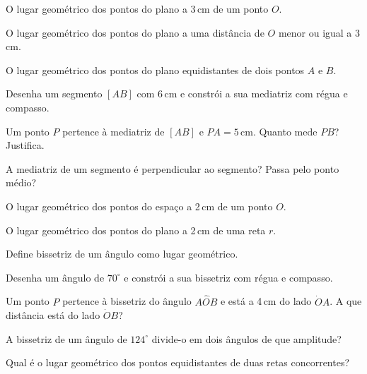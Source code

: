 \documentclass[12pt]{article}
\begin{document}


\begin{exercicios}
  \item O lugar geométrico dos pontos do plano a 3\,cm de um ponto $O$.
  \item O lugar geométrico dos pontos do plano a uma distância de $O$ menor ou igual a 3\,cm.
  \item O lugar geométrico dos pontos do plano equidistantes de dois pontos $A$ e $B$.
  \item Desenha um segmento $[AB]$ com 6\,cm e constrói a sua mediatriz com régua e compasso.
  \item Um ponto $P$ pertence à mediatriz de $[AB]$ e $PA = 5$\,cm. Quanto mede $PB$? Justifica.
  \item A mediatriz de um segmento é perpendicular ao segmento? Passa pelo ponto médio?
  \item O lugar geométrico dos pontos do espaço a 2\,cm de um ponto $O$.
  \item O lugar geométrico dos pontos do plano a 2\,cm de uma reta $r$.
\end{exercicios}

\begin{exercicios}
  \item Define bissetriz de um ângulo como lugar geométrico.
  \item Desenha um ângulo de $70^\circ$ e constrói a sua bissetriz com régua e compasso.
  \item Um ponto $P$ pertence à bissetriz do ângulo $A\hat{O}B$ e está a 4\,cm do lado $\dot{O}A$. A que distância está do lado $\dot{O}B$?
  \item A bissetriz de um ângulo de $124^\circ$ divide-o em dois ângulos de que amplitude?
  \item Qual é o lugar geométrico dos pontos equidistantes de duas retas concorrentes?
\end{exercicios}


\begin{center}
\end{center}
\end{document}
